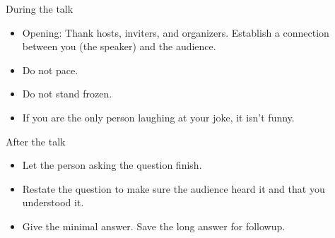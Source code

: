 During the talk
\begin{itemize}
    \item Opening: Thank hosts, inviters, and organizers. Establish a connection between you (the speaker) and the audience.
    \item Do not pace.
    \item Do not stand frozen.
    \item If you are the only person laughing at your joke, it isn't funny.
\end{itemize}
 
After the talk
\begin{itemize}
    \item Let the person asking the question finish.
    \item Restate the question to make sure the audience heard it and that you understood it.
    \item Give the minimal answer. Save the long answer for followup.
\end{itemize}
